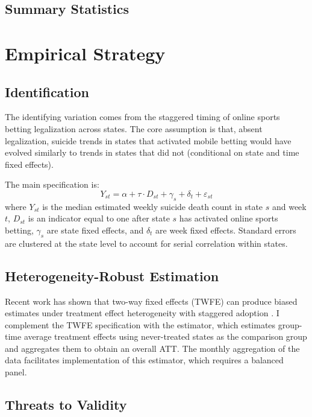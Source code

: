 \documentclass[12pt]{article}
\begin{document}
\subsection{Summary Statistics}




\section{Empirical Strategy}

\subsection{Identification}

The identifying variation comes from the staggered timing of online sports betting legalization across states. The core assumption is that, absent legalization, suicide trends in states that activated mobile betting would have evolved similarly to trends in states that did not (conditional on state and time fixed effects).

The main specification is:
\begin{equation}
Y_{st} = \alpha + \tau \cdot D_{st} + \gamma_s + \delta_t + \varepsilon_{st}
\label{eq:twfe}
\end{equation}
where $Y_{st}$ is the median estimated weekly suicide death count in state $s$ and week $t$, $D_{st}$ is an indicator equal to one after state $s$ has activated online sports betting, $\gamma_s$ are state fixed effects, and $\delta_t$ are week fixed effects. Standard errors are clustered at the state level to account for serial correlation within states.

\subsection{Heterogeneity-Robust Estimation}

Recent work has shown that two-way fixed effects (TWFE) can produce biased estimates under treatment effect heterogeneity with staggered adoption \citep{goodmanbacon2021, callaway2021, sun2021}. I complement the TWFE specification with the \citet{callaway2021} estimator, which estimates group-time average treatment effects using never-treated states as the comparison group and aggregates them to obtain an overall ATT. The monthly aggregation of the data facilitates implementation of this estimator, which requires a balanced panel.

\subsection{Threats to Validity}
\end{document}
